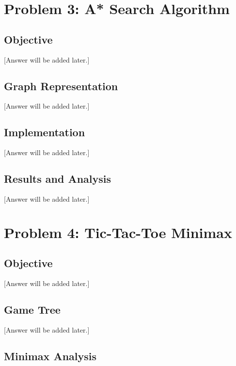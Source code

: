 \documentclass[12pt]{article}
\begin{document}
\section{Problem 3: A* Search Algorithm}

\subsection{Objective}

[Answer will be added later.]

\subsection{Graph Representation}

[Answer will be added later.]

\subsection{Implementation}

[Answer will be added later.]

\subsection{Results and Analysis}

[Answer will be added later.]

\section{Problem 4: Tic-Tac-Toe Minimax}

\subsection{Objective}

[Answer will be added later.]

\subsection{Game Tree}

[Answer will be added later.]

\subsection{Minimax Analysis}
\end{document}
